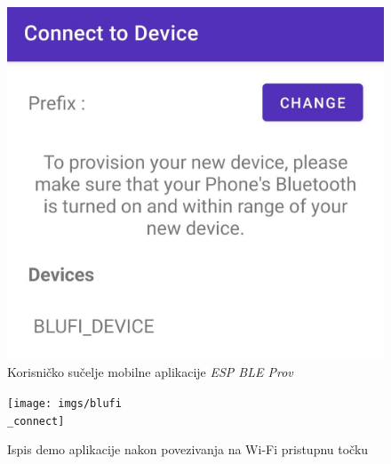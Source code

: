 \begin{figure}[ht]
	\centering
	\includegraphics[scale=0.15]{imgs/mob}
	\caption{Korisničko sučelje mobilne aplikacije \textit{ESP BLE Prov}}
	\label{fig:mob}
\end{figure}


\begin{figure}[ht]
	\centering
	\texttt{[image: imgs/blufi\\\_connect]}
	\caption{Ispis demo aplikacije nakon povezivanja na Wi-Fi pristupnu točku}
	\label{fig:blufi_connect}
\end{figure}

\eject